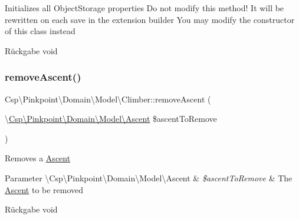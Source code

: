 Initializes all Object\+Storage properties Do not modify this method! It will be rewritten on each save in the extension builder You may modify the constructor of this class instead

\begin{DoxyReturn}{Rückgabe}
void 
\end{DoxyReturn}
\mbox{\label{classCsp_1_1Pinkpoint_1_1Domain_1_1Model_1_1Climber_a63744f07efb5ed76b2614d9ebf6659e7}} 
\subsubsection{\texorpdfstring{remove\+Ascent()}{removeAscent()}}
{\footnotesize\ttfamily Csp\textbackslash{}\+Pinkpoint\textbackslash{}\+Domain\textbackslash{}\+Model\textbackslash{}\+Climber\+::remove\+Ascent (\begin{DoxyParamCaption}\item[{\textbackslash{}\hyperlink{classCsp_1_1Pinkpoint_1_1Domain_1_1Model_1_1Ascent}{Csp\textbackslash{}\+Pinkpoint\textbackslash{}\+Domain\textbackslash{}\+Model\textbackslash{}\+Ascent}}]{\$ascent\+To\+Remove }\end{DoxyParamCaption})}

Removes a \hyperlink{classCsp_1_1Pinkpoint_1_1Domain_1_1Model_1_1Ascent}{Ascent}


\begin{DoxyParams}[1]{Parameter}
\textbackslash{}\+Csp\textbackslash{}\+Pinkpoint\textbackslash{}\+Domain\textbackslash{}\+Model\textbackslash{}\+Ascent & {\em \$ascent\+To\+Remove} & The \hyperlink{classCsp_1_1Pinkpoint_1_1Domain_1_1Model_1_1Ascent}{Ascent} to be removed \\
\hline
\end{DoxyParams}
\begin{DoxyReturn}{Rückgabe}
void 
\end{DoxyReturn}
\mbox{\label{classCsp_1_1Pinkpoint_1_1Domain_1_1Model_1_1Climber_ab6ecf42eb408a612b04f4e78157e500c}} 
